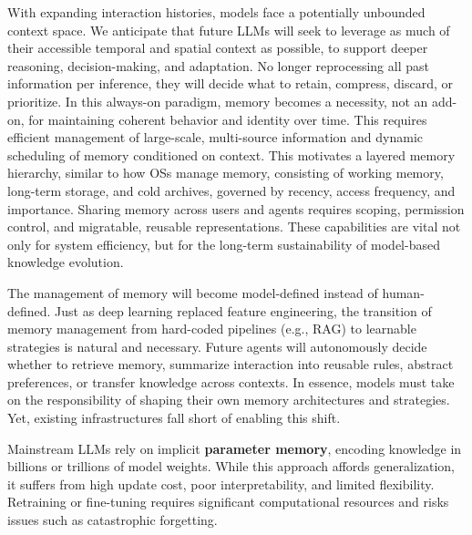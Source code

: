 \documentclass[]{memtensor}
\begin{document}
With expanding interaction histories, models face a potentially unbounded context space.
We anticipate that future LLMs will seek to leverage as much of their accessible temporal and spatial context as possible, to support deeper reasoning, decision-making, and adaptation.
No longer reprocessing all past information per inference, they will decide what to retain, compress, discard, or prioritize.
In this always-on paradigm, memory becomes a necessity, not an add-on, for maintaining coherent behavior and identity over time.
This requires efficient management of large-scale, multi-source information and dynamic scheduling of memory conditioned on context.
This motivates a layered memory hierarchy, similar to how OSs manage memory, consisting of working memory, long-term storage, and cold archives, governed by recency, access frequency, and importance.
Sharing memory across users and agents requires scoping, permission control, and migratable, reusable representations.
These capabilities are vital not only for system efficiency, but for the long-term sustainability of model-based knowledge evolution.

The management of memory will become model-defined instead of human-defined.
Just as deep learning replaced feature engineering, the transition of memory management from hard-coded pipelines (e.g., RAG) to learnable strategies is natural and necessary.
Future agents will autonomously decide whether to retrieve memory, summarize interaction into reusable rules, abstract preferences, or transfer knowledge across contexts.
In essence, models must take on the responsibility of shaping their own memory architectures and strategies.
Yet, existing infrastructures fall short of enabling this shift.

Mainstream LLMs rely on implicit \textbf{parameter memory}, encoding knowledge in billions or trillions of model weights.
While this approach affords generalization, it suffers from high update cost, poor interpretability, and limited flexibility.
Retraining or fine-tuning requires significant computational resources and risks issues such as catastrophic forgetting.
\end{document}
